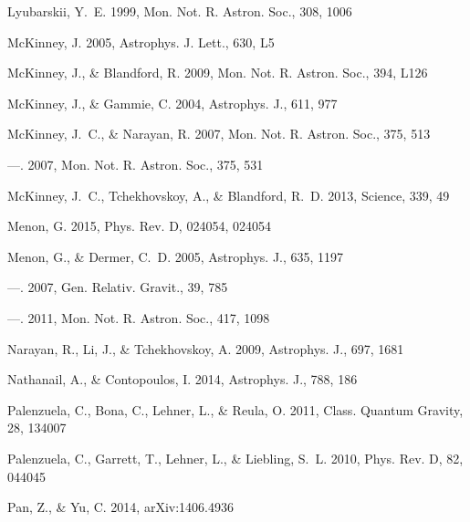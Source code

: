 \documentclass[iop,apj]{emulateapj}
\begin{document}
\begin{thebibliography}{}
Lyubarskii, Y.~E. 1999, Mon. Not. R. Astron. Soc., 308, 1006

McKinney, J. 2005, Astrophys. J. Lett., 630, L5

McKinney, J., \& Blandford, R. 2009, Mon. Not. R. Astron. Soc., 394, L126

McKinney, J., \& Gammie, C. 2004, Astrophys. J., 611, 977

McKinney, J.~C., \& Narayan, R. 2007{}, Mon. Not. R. Astron. Soc.,
  375, 513

---. 2007{}, Mon. Not. R. Astron. Soc., 375, 531

McKinney, J.~C., Tchekhovskoy, A., \& Blandford, R.~D. 2013, Science, 339, 49

Menon, G. 2015, Phys. Rev. D, 024054, 024054

Menon, G., \& Dermer, C.~D. 2005, Astrophys. J., 635, 1197

---. 2007, Gen. Relativ. Gravit., 39, 785

---. 2011, Mon. Not. R. Astron. Soc., 417, 1098

Narayan, R., Li, J., \& Tchekhovskoy, A. 2009, Astrophys. J., 697, 1681

Nathanail, A., \& Contopoulos, I. 2014, Astrophys. J., 788, 186

Palenzuela, C., Bona, C., Lehner, L., \& Reula, O. 2011, Class. Quantum
  Gravity, 28, 134007

Palenzuela, C., Garrett, T., Lehner, L., \& Liebling, S.~L. 2010, Phys. Rev. D,
  82, 044045

Pan, Z., \& Yu, C. 2014, arXiv:1406.4936


\end{thebibliography}
\end{document}
